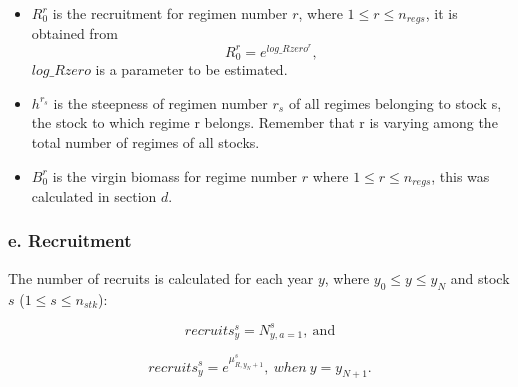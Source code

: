\documentclass{article}
\begin{document}
\begin{itemize}

\item $R^{r}_0$ is the recruitment for regimen number $r$, where $1\leq r \leq n_{regs}$, it is obtained from 
\begin{equation}
    R^r_0=e^{log\_Rzero^r},
\end{equation}
$log\_Rzero$ is a parameter to be estimated.
\item $h^{r_s}$ is the steepness of regimen number $r_s$ of all regimes belonging to stock s, the stock to which regime r belongs.  Remember that r is varying among the total number of regimes of all stocks.




\item $B^{r}_0$ is the virgin biomass for regime number $r$ where $1\leq r \leq n_{regs}$, this was calculated in section $d$.


\end{itemize}

\hfill

\subsubsection{e. Recruitment}


The number of recruits is calculated for each year $y$, where $y_0\leq y \leq y_N$ and stock $s$ ($1\leq s \leq n_{stk}$):

\begin{equation}
    recruits^s_y =N^s_{y,a = 1}, \ \text{and}
\end{equation}


\begin{equation}
    recruits^s_{y}=e^{\mu^s_{R,y_N+1}}, \ when \ y = y_{N+1}.
\end{equation}
\end{document}
